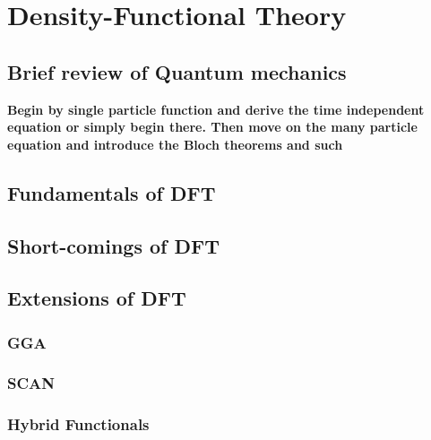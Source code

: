 \chapter{Density-Functional Theory}
\label{sec:DFT}


\section{Brief review of Quantum mechanics}
\textbf{Begin by single particle function and derive the time independent equation or simply begin there. Then move on the many particle equation and introduce the Bloch theorems and such} 

\section{Fundamentals of DFT}


\section{Short-comings of DFT}


\section{Extensions of DFT}

\subsection{GGA}
\subsection{SCAN}
\subsection{Hybrid Functionals}


